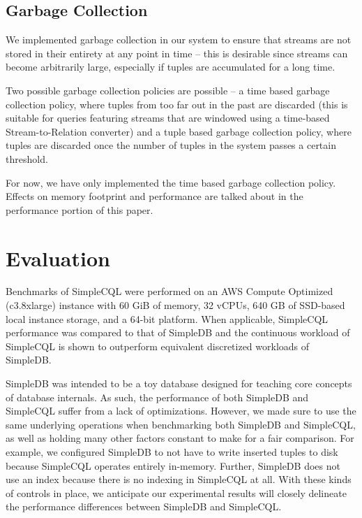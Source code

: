 \documentclass[a4paper, 10pt, conference]{IEEEconf}
\begin{document}
\subsection{Garbage Collection}
We implemented garbage collection in our system to ensure that streams are not stored in their entirety at any point in time -- this is desirable since streams can become arbitrarily large, especially if tuples are accumulated for a long time.

Two possible garbage collection policies are possible -- a time based garbage collection policy, where tuples from too far out in the past are discarded (this is suitable for queries featuring streams that are windowed using a time-based Stream-to-Relation converter) and a tuple based garbage collection policy, where tuples are discarded once the number of tuples in the system passes a certain threshold.

For now, we have only implemented the time based garbage collection policy. Effects on memory footprint and performance are talked about in the performance portion of this paper.


\section{Evaluation}
Benchmarks of SimpleCQL were performed on an AWS Compute Optimized (c3.8xlarge) instance with 60 GiB of memory, 32 vCPUs, 640 GB of SSD-based local instance storage, and a 64-bit platform.  When applicable, SimpleCQL performance was compared to that of SimpleDB and the continuous workload of SimpleCQL is shown to outperform equivalent discretized workloads of SimpleDB.  

SimpleDB was intended to be a toy database designed for teaching core concepts of database internals.  As such, the performance of both SimpleDB and SimpleCQL suffer from a lack of optimizations.  However, we made sure to use the same underlying operations when benchmarking both SimpleDB and SimpleCQL, as well as holding many other factors constant to make for a fair comparison. For example, we configured SimpleDB to not have to write inserted tuples to disk because SimpleCQL operates entirely in-memory. Further, SimpleDB does not use an index because there is no indexing in SimpleCQL at all. With these kinds of controls in place, we anticipate our experimental results will closely delineate the performance differences between SimpleDB and SimpleCQL.
\end{document}
